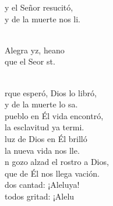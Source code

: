 \documentclass[12pt]{article}
\begin{document}
\begin{multicols*}{2}
\begin{cancion}%
	y el Señor resucitó,\\
	y de la muerte nos li. \\\jump\\
	\begin{chorus}%
	Alegra yz, heano\\
	que el Seor st.\\
	\end{chorus}%
	\jump\\
	rque esperó, Dios lo libró,\\
	y de la muerte lo sa.\\
\jump
	 pueblo en Él vida encontró,\\
	la esclavitud ya termi.\\
\jump
	 luz de Dios en Él brilló\\
	la nueva vida nos lle.\\
\jump
	n gozo alzad el rostro a Dios,\\
	que de Él nos llega vación.\\
\jump
	dos cantad: ¡Aleluya!\\
	todos gritad: ¡Alelu\\
\end{cancion}%


\end{multicols*}
\end{document}
